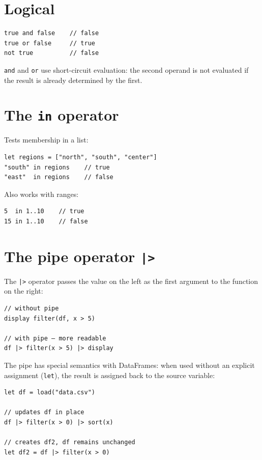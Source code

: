 \section{Logical}

\begin{lstlisting}
true and false    // false
true or false     // true
not true          // false
\end{lstlisting}

\lstinline{and} and \lstinline{or} use short-circuit evaluation: the
second operand is not evaluated if the result is already determined by
the first.

\section{The \texttt{in} operator}

Tests membership in a list:

\begin{lstlisting}
let regions = ["north", "south", "center"]
"south" in regions    // true
"east"  in regions    // false
\end{lstlisting}

Also works with ranges:

\begin{lstlisting}
5  in 1..10    // true
15 in 1..10    // false
\end{lstlisting}

\section{The pipe operator \texttt{|>}}
\label{sec:pipe}

The \lstinline{|>} operator passes the value on the left as the first
argument to the function on the right:

\begin{lstlisting}
// without pipe
display filter(df, x > 5)

// with pipe — more readable
df |> filter(x > 5) |> display
\end{lstlisting}

The pipe has special semantics with DataFrames: when used without an
explicit assignment (\lstinline{let}), the result is assigned back to the
source variable:

\begin{lstlisting}
let df = load("data.csv")

// updates df in place
df |> filter(x > 0) |> sort(x)

// creates df2, df remains unchanged
let df2 = df |> filter(x > 0)
\end{lstlisting}


